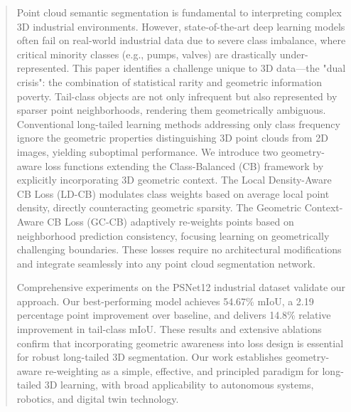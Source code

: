 \documentclass[preprint,12pt]{elsarticle}
\begin{document}
\begin{frontmatter}
\begin{abstract}
Point cloud semantic segmentation is fundamental to interpreting complex 3D industrial environments. However, state-of-the-art deep learning models often fail on real-world industrial data due to severe class imbalance, where critical minority classes (e.g., pumps, valves) are drastically under-represented. This paper identifies a challenge unique to 3D data—the "dual crisis": the combination of statistical rarity and geometric information poverty. Tail-class objects are not only infrequent but also represented by sparser point neighborhoods, rendering them geometrically ambiguous. Conventional long-tailed learning methods addressing only class frequency ignore the geometric properties distinguishing 3D point clouds from 2D images, yielding suboptimal performance.
We introduce two geometry-aware loss functions extending the Class-Balanced (CB) framework by explicitly incorporating 3D geometric context. The Local Density-Aware CB Loss (LD-CB) modulates class weights based on average local point density, directly counteracting geometric sparsity. The Geometric Context-Aware CB Loss (GC-CB) adaptively re-weights points based on neighborhood prediction consistency, focusing learning on geometrically challenging boundaries. These losses require no architectural modifications and integrate seamlessly into any point cloud segmentation network.

Comprehensive experiments on the PSNet12 industrial dataset validate our approach. Our best-performing model achieves 54.67\% mIoU, a 2.19 percentage point improvement over baseline, and delivers 14.8\% relative improvement in tail-class mIoU. These results and extensive ablations confirm that incorporating geometric awareness into loss design is essential for robust long-tailed 3D segmentation. Our work establishes geometry-aware re-weighting as a simple, effective, and principled paradigm for long-tailed 3D learning, with broad applicability to autonomous systems, robotics, and digital twin technology.
\end{abstract}


\end{frontmatter}
\end{document}
